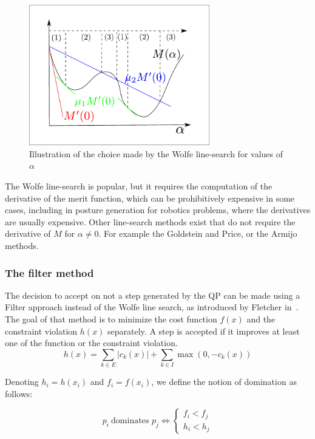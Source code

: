 \begin{figure}
  \centering
  \includegraphics[width=0.7\textwidth]{line-search.pdf}
  \caption{Illustration of the choice made by the Wolfe line-search for values of $\alpha$}
\label{fig:Wolfe}
\end{figure}

The Wolfe line-search is popular, but it requires the computation of the derivative of the merit function, which can be prohibitively expensive in some cases, including in posture generation for robotics problems, where the derivatives are usually expensive.
Other line-search methods exist that do not require the derivative of $M$ for $\alpha\neq0$. For example the Goldstein and Price, or the Armijo methods.

\subsubsection{The filter method}
\label{ssub:the_filter_method}
The decision to accept on not a step generated by the QP can be made using a Filter approach instead of the Wolfe line search, as introduced by Fletcher in~\cite{fletcher:mathprog:2000}.
The goal of that method is to minimize the cost function $f(x)$ and the constraint violation $h(x)$ separately.
A step is accepted if it improves at least one of the function or the constraint violation.
\begin{equation}
  h(x) = \sum\limits_{k\in E} |c_k(x)| + \sum\limits_{k\in I} \max(0, -c_k(x))
\end{equation}

Denoting $h_i = h(x_i)$ and $f_i = f(x_i)$, we define the notion of domination as follows:
\begin{definition}
  \begin{equation}
    p_i\ \text{dominates }p_j \Leftrightarrow \left\{
        \begin{array}{l}
    f_i < f_j \\
    h_i < h_j
  \end{array}  \right.
  \end{equation}
\end{definition}


